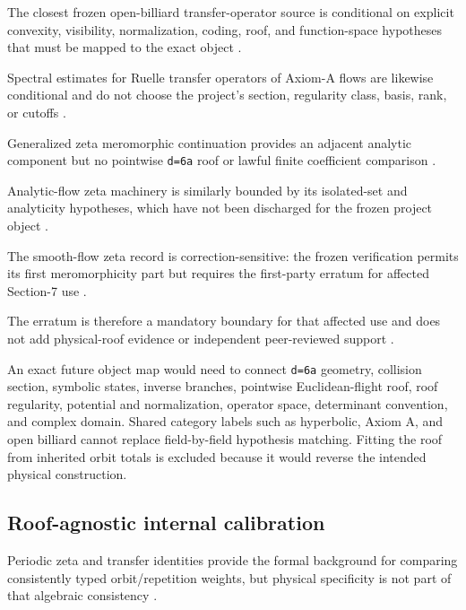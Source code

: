 \documentclass[11pt,a4paper]{article}
\begin{document}
The closest frozen open-billiard transfer-operator source is conditional on explicit convexity, visibility, normalization, coding, roof, and function-space hypotheses that must be mapped to the exact object
\citep{P30-S11}.

Spectral estimates for Ruelle transfer operators of Axiom-A flows are likewise conditional and do not choose the project's section, regularity class, basis, rank, or cutoffs
\citep{P30-S12}.

Generalized zeta meromorphic continuation provides an adjacent analytic component but no pointwise \texttt{d=6a} roof or lawful finite coefficient comparison
\citep{P30-S15}.

Analytic-flow zeta machinery is similarly bounded by its isolated-set and analyticity hypotheses, which have not been discharged for the frozen project object
\citep{P30-S16}.

The smooth-flow zeta record is correction-sensitive: the frozen verification permits its first meromorphicity part but requires the first-party erratum for affected Section-7 use
\citep{P30-S17}.

The erratum is therefore a mandatory boundary for that affected use and does not add physical-roof evidence or independent peer-reviewed support
\citep{P30-S18}.

An exact future object map would need to connect \texttt{d=6a} geometry, collision section, symbolic states, inverse branches, pointwise Euclidean-flight roof, roof regularity, potential and normalization, operator space, determinant convention, and complex domain. Shared category labels such as hyperbolic, Axiom A, and open billiard cannot replace field-by-field hypothesis matching. Fitting the roof from inherited orbit totals is excluded because it would reverse the intended physical construction.

\subsection{Roof-agnostic internal calibration}

Periodic zeta and transfer identities provide the formal background for comparing consistently typed orbit/repetition weights, but physical specificity is not part of that algebraic consistency
\citep{P30-S13}.
\end{document}
